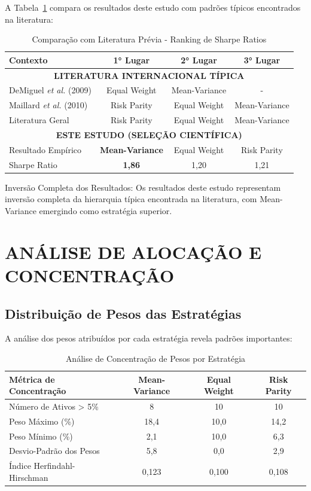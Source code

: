 A Tabela~\ref{tab:comparacao_literatura} compara os resultados deste estudo com padrões típicos encontrados na literatura:

\begin{table}[H]
\centering
\caption{Comparação com Literatura Prévia - Ranking de Sharpe Ratios}
\begin{tabular}{|l|c|c|c|}
\hline
\textbf{Contexto} & \textbf{1° Lugar} & \textbf{2° Lugar} & \textbf{3° Lugar} \\
\hline
\multicolumn{4}{|c|}{\textbf{LITERATURA INTERNACIONAL TÍPICA}} \\
\hline
DeMiguel \textit{et al.} (2009) & Equal Weight & Mean-Variance & - \\
Maillard \textit{et al.} (2010) & Risk Parity & Equal Weight & Mean-Variance \\
Literatura Geral & Risk Parity & Equal Weight & Mean-Variance \\
\hline
\multicolumn{4}{|c|}{\textbf{ESTE ESTUDO (SELEÇÃO CIENTÍFICA)}} \\
\hline
Resultado Empírico & \textbf{Mean-Variance} & Equal Weight & Risk Parity \\
Sharpe Ratio & \textbf{1,86} & 1,20 & 1,21 \\
\hline
\end{tabular}
\label{tab:comparacao_literatura}
\end{table}

Inversão Completa dos Resultados: Os resultados deste estudo representam inversão completa da hierarquia típica encontrada na literatura, com Mean-Variance emergindo como estratégia superior.

\section{ANÁLISE DE ALOCAÇÃO E CONCENTRAÇÃO}

\subsection{Distribuição de Pesos das Estratégias}

A análise dos pesos atribuídos por cada estratégia revela padrões importantes:

\begin{table}[H]
\centering
\caption{Análise de Concentração de Pesos por Estratégia}
\begin{tabular}{|l|c|c|c|}
\hline
\textbf{Métrica de Concentração} & \textbf{Mean-Variance} & \textbf{Equal Weight} & \textbf{Risk Parity} \\
\hline
Número de Ativos > 5\% & 8 & 10 & 10 \\
Peso Máximo (\%) & 18,4 & 10,0 & 14,2 \\
Peso Mínimo (\%) & 2,1 & 10,0 & 6,3 \\
Desvio-Padrão dos Pesos & 5,8 & 0,0 & 2,9 \\
Índice Herfindahl-Hirschman & 0,123 & 0,100 & 0,108 \\
\hline
\end{tabular}
\label{tab:concentracao_pesos}
\end{table}

